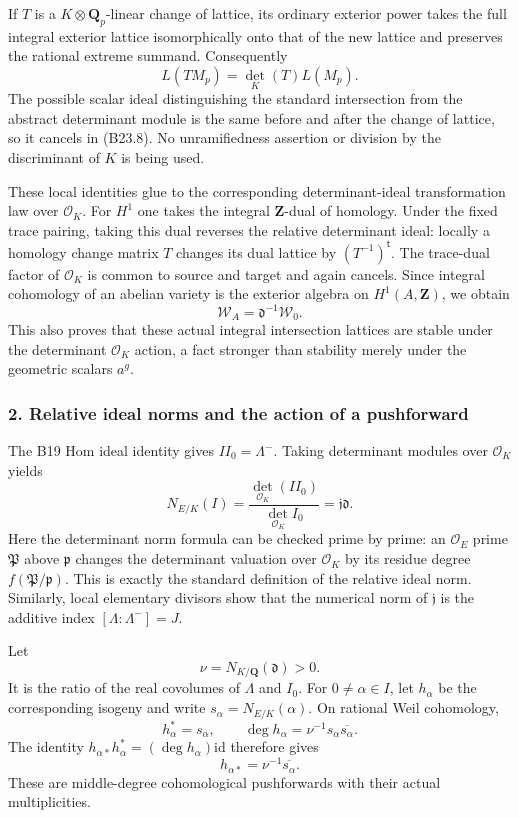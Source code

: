 \documentclass[11pt,a4paper]{article}
\theoremstyle{definition}
\begin{document}
If \(T\) is a \(K\otimes\mathbf Q_p\)-linear change of lattice, its ordinary exterior power takes the full integral exterior lattice isomorphically onto that of the new lattice and preserves the rational extreme summand. Consequently \[
 L(TM_p)=\det_K(T)L(M_p).
\tag{B23.8}
\] The possible scalar ideal distinguishing the standard intersection from the abstract determinant module is the same before and after the change of lattice, so it cancels in (B23.8). No unramifiedness assertion or division by the discriminant of \(K\) is being used.

These local identities glue to the corresponding determinant-ideal transformation law over \(\mathcal O_K\). For \(H^1\) one takes the integral \(\mathbf Z\)-dual of homology. Under the fixed trace pairing, taking this dual reverses the relative determinant ideal: locally a homology change matrix \(T\) changes its dual lattice by \((T^{-1})^{\mathsf t}\). The trace-dual factor of \(\mathcal O_K\) is common to source and target and again cancels. Since integral cohomology of an abelian variety is the exterior algebra on \(H^1(A,\mathbf Z)\), we obtain \[
 \mathscr W_A=\mathfrak d^{-1}\mathscr W_0.
\] This also proves that these actual integral intersection lattices are stable under the determinant \(\mathcal O_K\) action, a fact stronger than stability merely under the geometric scalars \(a^g\).

\subsubsection{2. Relative ideal norms and the action of a pushforward}\label{relative-ideal-norms-and-the-action-of-a-pushforward}

The B19 Hom ideal identity gives \(II_0=\Lambda^-\). Taking determinant modules over \(\mathcal O_K\) yields \[
 N_{E/K}(I)=\frac{\det_{\mathcal O_K}(II_0)}
                    {\det_{\mathcal O_K}I_0}
 =\mathfrak j\mathfrak d.
\tag{B23.9}
\] Here the determinant norm formula can be checked prime by prime: an \(\mathcal O_E\) prime \(\mathfrak P\) above \(\mathfrak p\) changes the determinant valuation over \(\mathcal O_K\) by its residue degree \(f(\mathfrak P/\mathfrak p)\). This is exactly the standard definition of the relative ideal norm. Similarly, local elementary divisors show that the numerical norm of \(\mathfrak j\) is the additive index \([\Lambda:\Lambda^-]=J\).

Let \[
 \nu=N_{K/\mathbf Q}(\mathfrak d)>0.
\] It is the ratio of the real covolumes of \(\Lambda\) and \(I_0\). For \(0\ne\alpha\in I\), let \(h_\alpha\) be the corresponding isogeny and write \(s_\alpha=N_{E/K}(\alpha)\). On rational Weil cohomology, \[
 h_\alpha^*=s_\alpha,\qquad
 \deg h_\alpha=\nu^{-1}s_\alpha\overline{s_\alpha}.
\] The identity \(h_{\alpha*}h_\alpha^*=(\deg h_\alpha)\mathrm{id}\) therefore gives \[
 h_{\alpha*}=\nu^{-1}\overline{s_\alpha}.
\tag{B23.10}
\] These are middle-degree cohomological pushforwards with their actual multiplicities.
\end{document}
